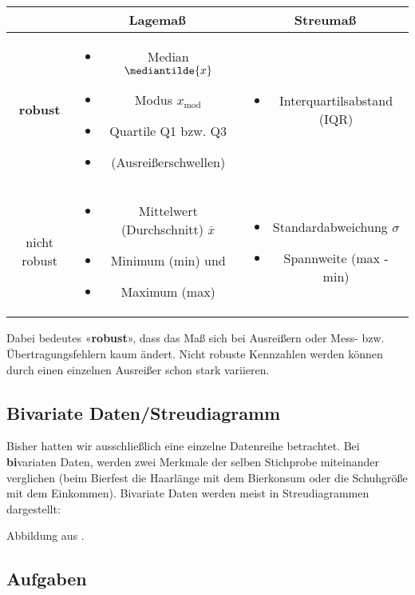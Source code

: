 \begin{tabular}{|c|c|c|}
  \hline
   & Lagemaß & Streumaß \\
  \hline
  \textbf{robust} &
  \begin{minipage} [t] {0.4\textwidth}
    \begin{itemize}
    \item Median $\mediantilde{x}$
    \item Modus $x_{\textrm{mod}}$
    \item Quartile Q1 bzw. Q3
    \item (Ausreißerschwellen)
  \end{itemize} \end{minipage}
  & \begin{minipage} [t] {0.4\textwidth}
    \begin{itemize}
    \item Interquartilsabstand (IQR)
  \end{itemize} \end{minipage} \\
  \hline
  nicht robust & \begin{minipage} [t] {0.4\textwidth}
    \begin{itemize}
    \item Mittelwert (Durchschnitt) $\overline{x}$
    \item Minimum (min) und
    \item Maximum (max)
  \end{itemize} \end{minipage} & \begin{minipage} [t] {0.4\textwidth}
    \begin{itemize}
    \item Standardabweichung $\sigma$
    \item Spannweite (max - min)
  \end{itemize} \end{minipage} \\
  \hline
  \end{tabular} 

Dabei bedeutes «\textbf{robust}», dass das Maß sich bei Ausreißern oder Mess- bzw. Übertragungsfehlern kaum ändert. Nicht robuste Kennzahlen werden können durch einen einzelnen Ausreißer schon stark variieren.



\subsection{Bivariate Daten/Streudiagramm}
Bisher hatten wir ausschließlich eine einzelne Datenreihe
betrachtet. 
Bei \textbf{bi}variaten Daten, werden zwei Merkmale der selben Stichprobe miteinander verglichen (\zB beim Bierfest die Haarlänge mit dem Bierkonsum oder die Schuhgröße mit dem Einkommen). Bivariate Daten werden meist in Streudiagrammen dargestellt:



Abbildung aus \cite{marthaler17}.


\subsection*{Aufgaben}



